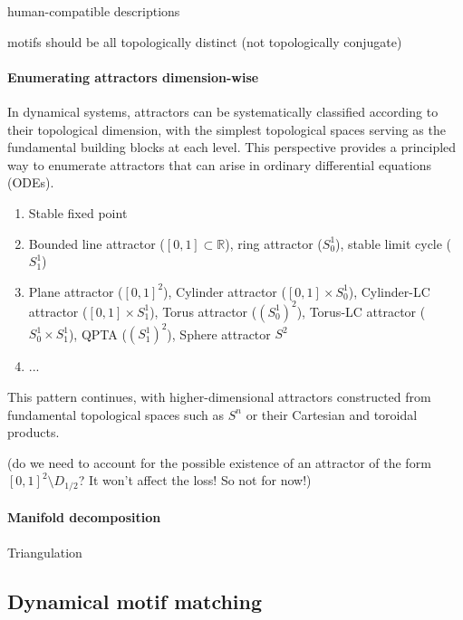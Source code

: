 \documentclass{article}
\newcommand{\ascomment}[1]{\textcolor{ascolor}{(#1)}}
\theoremstyle{definition} \newtheorem{definition}{Definition}  \newtheorem{example}{Example}
\theoremstyle{remark} \newtheorem{remark}{Remark}
\newcommand{\reals}{\mathbb{R}}
\newcounter{ct}
\begin{document}
human-compatible descriptions

motifs should be all topologically distinct (not topologically conjugate)



\paragraph{Enumerating attractors dimension-wise}
In dynamical systems, attractors can be systematically classified according to their topological dimension, with the simplest topological spaces serving as the fundamental building blocks at each level. This perspective provides a principled way to enumerate attractors that can arise in ordinary differential equations (ODEs).
\begin{enumerate}[start=0,label={\bfseries Dim \arabic*:}]
\item  Stable fixed point
\item  Bounded line attractor ($[0,1]\subset\reals$), ring attractor ($S_0^1$), stable limit cycle ($S_1^1$)
\item Plane attractor ($[0,1]^2$), Cylinder attractor ($[0,1]\times S_0^1$), Cylinder-LC attractor ($[0,1]\times S_1^1$), Torus attractor ($(S_0^1)^2$), Torus-LC attractor ($S_0^1\times S_1^1$), QPTA ($(S_1^1)^2$), Sphere attractor $S^2$
\item ...
\end{enumerate}

This pattern continues, with higher-dimensional attractors constructed from fundamental topological spaces such as $S^n$ or their Cartesian and toroidal products.

\ascomment{do we need to account for the possible existence of an attractor of the form $[0,1]^2\setminus D_{1/2}$? It won't affect the loss! So not for now!}


\paragraph{Manifold decomposition}
Triangulation

\subsection{Dynamical motif matching}
\end{document}
